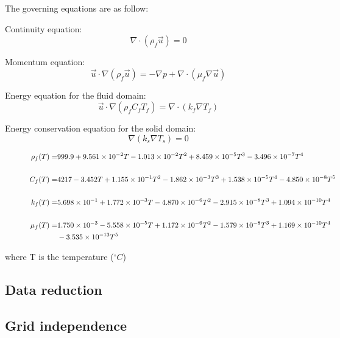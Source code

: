 The governing equations are as follow:

Continuity equation:
\begin{equation}
    \nabla \cdot \left(\rho_f \vec{u}\right)=0
\end{equation}

Momentum equation:
\begin{equation}
    \vec{u} \cdot \nabla\left(\rho_f \vec{u}\right)=-\nabla p+\nabla \cdot\left(\mu_f \nabla \vec{u}\right)
\end{equation}

Energy equation for the fluid domain:
\begin{equation}
    \vec{u} \cdot \nabla\left(\rho_f C_{f} T_f\right)=\nabla \cdot\left(k_f \nabla T_f\right)
\end{equation}

Energy conservation equation for the solid domain:
\begin{equation}
    \nabla\left(k_s \nabla T_s\right)=0
\end{equation}


\begin{figure*}[htb] %
    \begin{align}
        \rho_{f}(T)= & 999.9+9.561 \times 10^{-2} T-1.013 \times 10^{-2} T^{2}+8.459 \times 10^{-5} T^{3}-3.496 \times 10^{-7} T^{4}                      \\ \notag\\
        C_{f}(T)=    & 4217-3.452 T+1.155 \times 10^{-1} T^{2}-1.862 \times 10^{-3} T^{3}+1.538 \times10^{-5}T^{4}-4.850 \times 10^{-8} T^{5}             \\ \notag\\
        k_{f}(T)=    & 5.698 \times 10^{-1}+1.772 \times 10^{-3} T-4.870 \times 10^{-6} T^{2}-2.915 \times10^{-8} T^{3}+1.094 \times 10^{-10} T^{4}       \\ \notag\\
        \mu_{f}(T)=  & 1.750 \times 10^{-3}-5.558 \times 10^{-5} T+1.172 \times 10^{-6} T^{2}-1.579 \times10^{-8} T^{3}+1.169 \times 10^{-10} T^{4}\notag \\
                     & -3.535 \times 10^{-13} T^{5}
    \end{align}
\end{figure*}


where T is the temperature ($^{\circ}C$)







\subsection{Data reduction}


\subsection{Grid independence}
